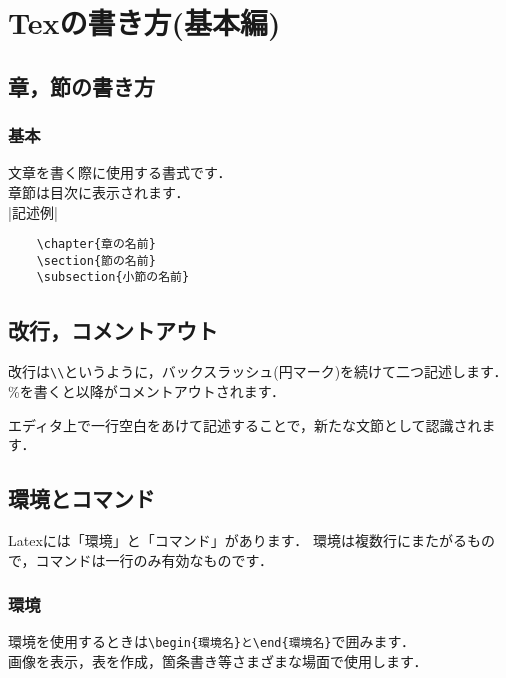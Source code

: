 \chapter{Texの書き方(基本編)}
\label {chp:tex_basic}

\section{章，節の書き方}
\label{sec:tex_basic_section}
\subsection{基本}
\label{sub:tex_basic_section_basic}
    文章を書く際に使用する書式です．\\
    章節は目次に表示されます．\\
    |記述例|
    \begin{verbatim}
    \chapter{章の名前}
    \section{節の名前}
    \subsection{小節の名前}
    \end{verbatim}

\section{改行，コメントアウト}
\label{sec:tex_basic_newline}
    改行は\verb|\\|というように，バックスラッシュ(円マーク)を続けて二つ記述します．\\
    \%を書くと以降がコメントアウトされます．

    エディタ上で一行空白をあけて記述することで，新たな文節として認識されます．

\section{環境とコマンド}
\label{sec:tex_basic_envcmd}
    Latexには「環境」と「コマンド」があります．
    環境は複数行にまたがるもので，コマンドは一行のみ有効なものです．
\subsection{環境}
\label{sub:tex_basic_section_envcmd_env}
    環境を使用するときは\verb|\begin{環境名}と\end{環境名}|で囲みます．\\
    画像を表示，表を作成，箇条書き等さまざまな場面で使用します．

